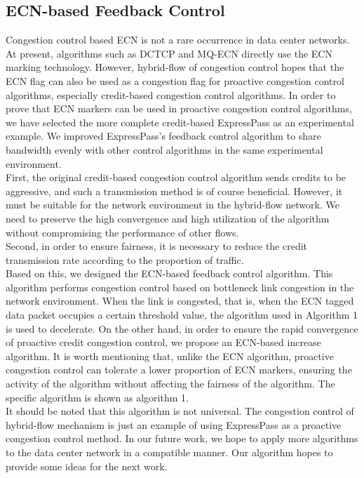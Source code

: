 \documentclass[conference]{IEEEtran}
\begin{document}
\subsection{ECN-based Feedback Control}
Congestion control based ECN is not a rare occurrence in data center networks. At present, algorithms such as DCTCP and MQ-ECN directly use the ECN marking technology. However, hybrid-flow of congestion control hopes that the ECN flag can also be used as a congestion flag for proactive congestion control algorithms, especially credit-based congestion control algorithms. In order to prove that ECN markers can be used in proactive congestion control algorithms, we have selected the more complete credit-based ExpressPass as an experimental example. We improved ExpressPass's feedback control algorithm to share bandwidth evenly with other control algorithms in the same experimental environment.\\
\indent First, the original credit-based congestion control algorithm sends credits to be aggressive, and such a transmission method is of course beneficial. However, it must be suitable for the network environment in the hybrid-flow network. We need to preserve the high convergence and high utilization of the algorithm without compromising the performance of other flows.\\
\indent Second, in order to ensure fairness, it is necessary to reduce the credit transmission rate according to the proportion of traffic.\\
\indent Based on this, we designed the ECN-based feedback control algorithm. This algorithm performs congestion control based on bottleneck link congestion in the network environment. When the link is congested, that is, when the ECN tagged data packet occupies a certain threshold value, the algorithm used in Algorithm 1 is used to decelerate. On the other hand, in order to ensure the rapid convergence of proactive credit congestion control, we propose an ECN-based increase algorithm. It is worth mentioning that, unlike the ECN algorithm, proactive congestion control can tolerate a lower proportion of ECN markers, ensuring the activity of the algorithm without affecting the fairness of the algorithm. The specific algorithm is shown as algorithm 1.\\
\indent It should be noted that this algorithm is not universal. The congestion control of hybrid-flow mechanism is just an example of using ExpressPass as a proactive congestion control method. In our future work, we hope to apply more algorithms to the data center network in a compatible manner. Our algorithm hopes to provide some ideas for the next work.
\end{document}
